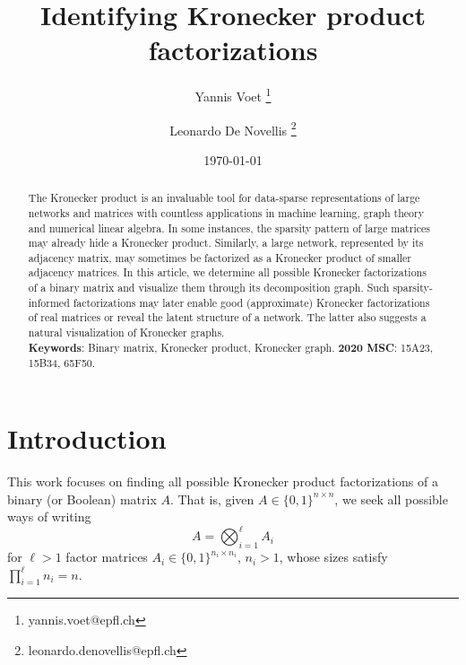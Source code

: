 \documentclass{article}
\title{Identifying Kronecker product factorizations}
\author[1]{Yannis Voet \thanks{yannis.voet@epfl.ch}}
\author[1]{Leonardo De Novellis \thanks{leonardo.denovellis@epfl.ch}}
\affil[1]{\small MNS, Institute of Mathematics, École polytechnique fédérale de Lausanne, Station 8, CH-1015 Lausanne, Switzerland}
\date{\today}
\numberwithin{equation}{section}
\theoremstyle{definition}
\begin{document}
\maketitle

\begin{abstract}
The Kronecker product is an invaluable tool for data-sparse representations of large networks and matrices with countless applications in machine learning, graph theory and numerical linear algebra. In some instances, the sparsity pattern of large matrices may already hide a Kronecker product. Similarly, a large network, represented by its adjacency matrix, may sometimes be factorized as a Kronecker product of smaller adjacency matrices. In this article, we determine all possible Kronecker factorizations of a binary matrix and visualize them through its decomposition graph. Such sparsity-informed factorizations may later enable good (approximate) Kronecker factorizations of real matrices or reveal the latent structure of a network. The latter also suggests a natural visualization of Kronecker graphs. \\

\noindent \textbf{Keywords}:
Binary matrix, Kronecker product, Kronecker graph.
\vskip 0.1cm 
\noindent \textbf{2020 MSC}: 15A23, 15B34, 65F50.
\end{abstract}

\section{Introduction}
This work focuses on finding all possible Kronecker product factorizations of a binary (or Boolean) matrix $A$. That is, given $A \in \{0,1\}^{n \times n}$, we seek all possible ways of writing
\begin{equation}
\label{eq: factorization}
A = \bigotimes_{i=1}^{\ell} A_i  
\end{equation}
for $\ell > 1$ factor matrices $A_i \in \{0,1\}^{n_i \times n_i}$, $n_i > 1$, whose sizes satisfy $\prod_{i=1}^\ell n_i = n$.
\end{document}
